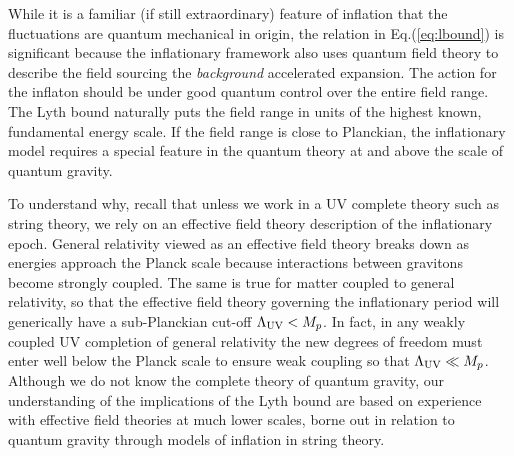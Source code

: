While it is a familiar (if still extraordinary) feature of inflation that the fluctuations are quantum mechanical in origin, the relation in Eq.(\ref{eq:lbound}) is significant because the inflationary framework also uses quantum field theory to describe the field sourcing the {\it background} accelerated expansion. The action for the inflaton should be under good quantum control over the entire field range. The Lyth bound naturally puts the field range in units of the highest known, fundamental energy scale. If the field range is close to Planckian, the inflationary model requires a special feature in the quantum theory at and above the scale of quantum gravity.

To understand why, recall that unless we work in a UV complete theory such as string theory, we rely on an effective field theory description of the inflationary epoch. General relativity viewed as an effective field theory breaks down as energies approach the Planck scale because interactions between gravitons become strongly coupled. The same is true for matter coupled to general relativity, so that the effective field theory governing the inflationary period will generically have a sub-Planckian cut-off $\Lambda_{\rm UV}<M_p$. In fact, in any weakly coupled UV completion of general relativity the new degrees of freedom must enter well below the Planck scale to ensure weak coupling so that $\Lambda_{\rm UV}\ll M_p$. Although we do not know the complete theory of quantum gravity, our understanding of the implications of the Lyth bound are based on experience with effective field theories at much lower scales, borne out in relation to quantum gravity through models of inflation in string theory.

